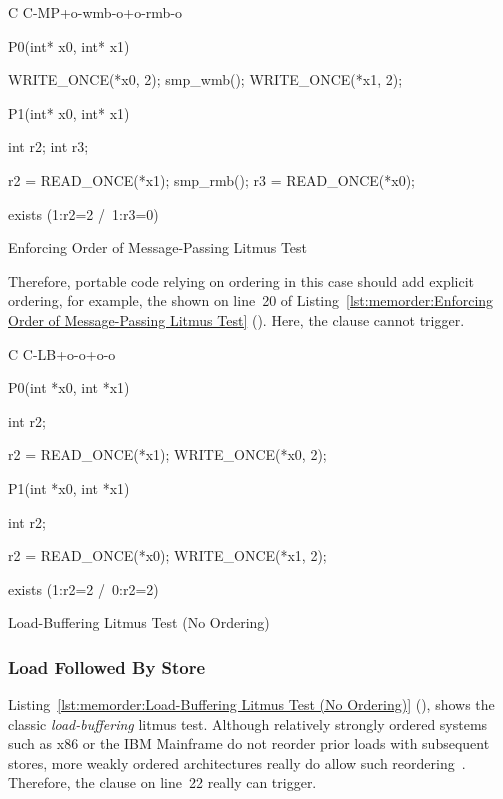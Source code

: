 \begin{listing}[tbp]
{ \scriptsize
\begin{verbbox}[\LstLineNo]
C C-MP+o-wmb-o+o-rmb-o

{
}

P0(int* x0, int* x1) {

  WRITE_ONCE(*x0, 2);
  smp_wmb();
  WRITE_ONCE(*x1, 2);

}

P1(int* x0, int* x1) {

  int r2;
  int r3;

  r2 = READ_ONCE(*x1);
  smp_rmb();
  r3 = READ_ONCE(*x0);

}

exists (1:r2=2 /\ 1:r3=0)
\end{verbbox}
}
\centering
\theverbbox
\caption{Enforcing Order of Message-Passing Litmus Test}
\label{lst:memorder:Enforcing Order of Message-Passing Litmus Test}
\end{listing}

Therefore, portable code relying on ordering in this case should
add explicit ordering, for example, the  shown on
line~20 of
Listing~\ref{lst:memorder:Enforcing Order of Message-Passing Litmus Test}
().
Here, the  clause cannot trigger.

\begin{listing}[tbp]
{ \scriptsize
\begin{verbbox}[\LstLineNo]
C C-LB+o-o+o-o
{
}

P0(int *x0, int *x1)
{
  int r2;

  r2 = READ_ONCE(*x1);
  WRITE_ONCE(*x0, 2);
}


P1(int *x0, int *x1)
{
  int r2;

  r2 = READ_ONCE(*x0);
  WRITE_ONCE(*x1, 2);
}

exists (1:r2=2 /\ 0:r2=2)
\end{verbbox}
}
\centering
\theverbbox
\caption{Load-Buffering Litmus Test (No Ordering)}
\label{lst:memorder:Load-Buffering Litmus Test (No Ordering)}
\end{listing}

\subsubsection{Load Followed By Store}
Listing~\ref{lst:memorder:Load-Buffering Litmus Test (No Ordering)}
(),
shows the classic \emph{load-buffering} litmus test.
Although relatively strongly ordered systems such as x86
or the IBM Mainframe do not reorder prior loads with subsequent stores,
more weakly ordered architectures really do allow such
reordering~\cite{JadeAlglave2011ppcmem}.
Therefore, the  clause on line~22 really can trigger.

